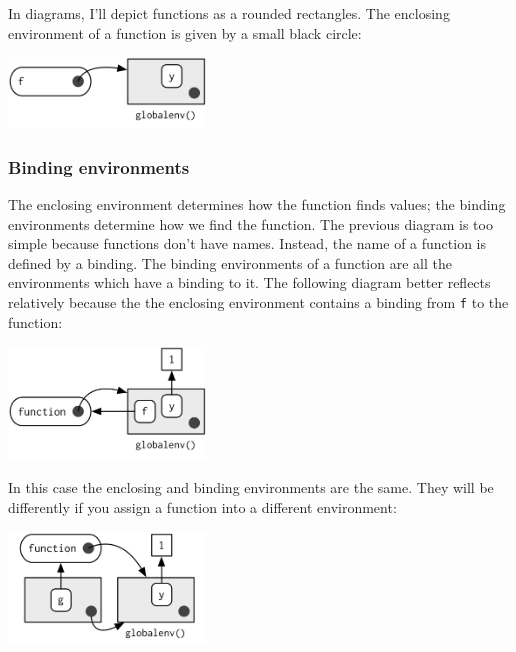 \documentclass[oneside]{book}
\newenvironment{Shaded}{}{}
\newcommand{\KeywordTok} [1]{\textcolor[rgb]{0.00,0.44,0.13}{{#1}}}
\newcommand{\DecValTok}  [1]{\textcolor[rgb]{0.25,0.63,0.44}{{#1}}}
\newcommand{\StringTok}  [1]{\textcolor[rgb]{0.25,0.44,0.63}{{#1}}}
\newcommand{\NormalTok}  [1]{{#1}}
\begin{document}
In diagrams, I'll depict functions as a rounded rectangles. The
enclosing environment of a function is given by a small black circle:

\includegraphics[width=2.06in,height=0.74in]{diagrams/environments.png/enclosing.png}

\subsubsection{Binding environments}\label{binding-environments}

The enclosing environment determines how the function finds values; the
binding environments determine how we find the function. The previous
diagram is too simple because functions don't have names. Instead, the
name of a function is defined by a binding. The binding environments of
a function are all the environments which have a binding to it. The
following diagram better reflects relatively because the the enclosing
environment contains a binding from \texttt{f} to the function:

\includegraphics[width=2.06in,height=1.18in]{diagrams/environments.png/binding.png}

In this case the enclosing and binding environments are the same. They
will be differently if you assign a function into a different
environment:

\begin{Shaded}
\end{Shaded}

\includegraphics[width=2.06in,height=1.18in]{diagrams/environments.png/binding-2.png}
\end{document}
